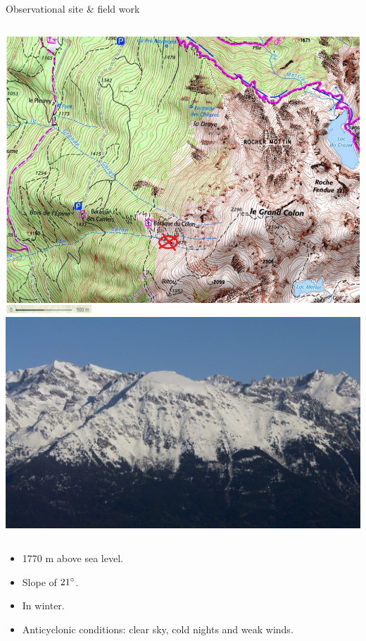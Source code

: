 \documentclass{beamer}
\begin{document}
\begin{frame}{Observational site \& field work}

\begin{columns}
\includegraphics[width=1.1\textwidth]{fig/grand_colon_jakob.png}
\includegraphics[width=1\textwidth]{fig/gc.jpg}
\end{columns}

\begin{itemize}
    \item 1770 m above sea level.
    \item Slope of $21\degree$.
    \item In winter.
    \item Anticyclonic conditions: clear sky, cold nights and weak winds.
\end{itemize}
\end{frame}
\end{document}
